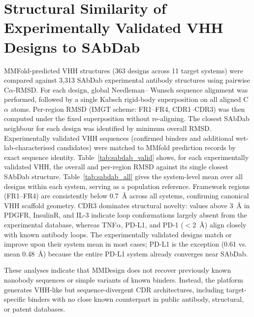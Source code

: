\documentclass[11pt]{article}
\begin{document}
\section{Structural Similarity of Experimentally Validated VHH Designs to SAbDab}
\label{app:B}
MMFold-predicted VHH structures (363 designs across 11 target systems) were compared against 3,313
SAbDab experimental antibody structures using pairwise C$\alpha$-RMSD. For each design, global Needleman--
Wunsch sequence alignment was performed, followed by a single Kabsch rigid-body superposition on all
aligned C$\alpha$ atoms. Per-region RMSD (IMGT scheme: FR1--FR4, CDR1--CDR3) was then computed under
the fixed superposition without re-aligning. The closest SAbDab neighbour for each design was identified
by minimum overall RMSD. Experimentally validated VHH sequences (confirmed binders and additional
wet-lab-characterised candidates) were matched to MMfold prediction records by exact sequence identity.
Table~\ref{tab:sabdab_valid} shows, for each experimentally validated VHH, the overall and per-region RMSD against its single
closest SAbDab structure. Table~\ref{tab:sabdab_all} gives the system-level mean over all designs within each system, serving
as a population reference. Framework regions (FR1--FR4) are consistently below 0.7~\AA{} across all systems,
confirming canonical VHH scaffold geometry. CDR3 dominates structural novelty: values above 3~\AA{} in
PDGFR, InsulinR, and IL-3 indicate loop conformations largely absent from the experimental database,
whereas TNF$\alpha$, PD-L1, and PD-1 ($<$2~\AA{}) align closely with known antibody loops. The experimentally
validated designs match or improve upon their system mean in most cases; PD-L1 is the exception (0.61 vs.
mean 0.48~\AA{}) because the entire PD-L1 system already converges near SAbDab.

These analyses indicate that MMDesign does not recover previously known nanobody sequences or
simple variants of known binders. Instead, the platform generates VHH-like but sequence-divergent CDR
architectures, including target-specific binders with no close known counterpart in public antibody, structural,
or patent databases.
\end{document}
